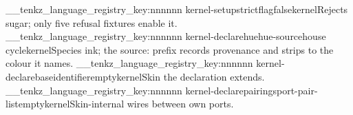 \__tenkz_language_registry_key:nnnnnn {kernel-setup}{strict}{flag}{false}{kernel}{Rejects sugar; only five refusal fixtures enable it.}
\__tenkz_language_registry_key:nnnnnn {kernel-declare}{hue}{hue-source}{house cycle}{kernel}{Species ink; the source: prefix records provenance and strips to the colour it names.}
\__tenkz_language_registry_key:nnnnnn {kernel-declare}{base}{identifier}{empty}{kernel}{Skin the declaration extends.}
\__tenkz_language_registry_key:nnnnnn {kernel-declare}{pairings}{port-pair-list}{empty}{kernel}{Skin-internal wires between own ports.}

